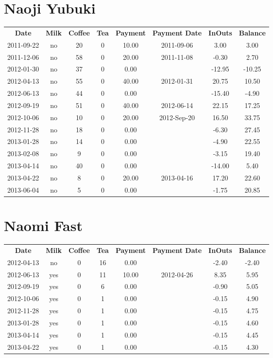 \section{Naoji Yubuki}

\begin{center}
\begin{tabular}{cccccccc}
\textbf{Date} & \textbf{Milk} & \textbf{Coffee} & \textbf{Tea} & \textbf{Payment} & \textbf{Payment Date} & \textbf{InOuts} & \textbf{Balance} \\
2011-09-22 & no & 20 & 0 & 10.00 & 2011-09-06 &   3.00 &   3.00\\ 
2011-12-06 & no & 58 & 0 & 20.00 & 2011-11-08 &  -0.30 &   2.70\\ 
2012-01-30 & no & 37 & 0 &  0.00 &  & -12.95 & -10.25\\ 
2012-04-13 & no & 55 & 0 & 40.00 & 2012-01-31 &  20.75 &  10.50\\ 
2012-06-13 & no & 44 & 0 &  0.00 &  & -15.40 &  -4.90\\ 
2012-09-19 & no & 51 & 0 & 40.00 & 2012-06-14 &  22.15 &  17.25\\ 
2012-10-06 & no & 10 & 0 & 20.00 & 2012-Sep-20 &  16.50 &  33.75\\ 
2012-11-28 & no & 18 & 0 &  0.00 &  &  -6.30 &  27.45\\ 
2013-01-28 & no & 14 & 0 &  0.00 &  &  -4.90 &  22.55\\ 
2013-02-08 & no &  9 & 0 &  0.00 &  &  -3.15 &  19.40\\ 
2013-04-14 & no & 40 & 0 &  0.00 &  & -14.00 &   5.40\\ 
2013-04-22 & no &  8 & 0 & 20.00 & 2013-04-16 &  17.20 &  22.60\\ 
2013-06-04 & no &  5 & 0 &  0.00 &  &  -1.75 &  20.85
\end{tabular}
\end{center}

\section{Naomi Fast}

\begin{center}
\begin{tabular}{cccccccc}
\textbf{Date} & \textbf{Milk} & \textbf{Coffee} & \textbf{Tea} & \textbf{Payment} & \textbf{Payment Date} & \textbf{InOuts} & \textbf{Balance} \\
2012-04-13 & no & 0 & 16 &  0.00 &  & -2.40 & -2.40\\ 
2012-06-13 & yes & 0 & 11 & 10.00 & 2012-04-26 &  8.35 &  5.95\\ 
2012-09-19 & yes & 0 &  6 &  0.00 &  & -0.90 &  5.05\\ 
2012-10-06 & yes & 0 &  1 &  0.00 &  & -0.15 &  4.90\\ 
2012-11-28 & yes & 0 &  1 &  0.00 &  & -0.15 &  4.75\\ 
2013-01-28 & yes & 0 &  1 &  0.00 &  & -0.15 &  4.60\\ 
2013-04-14 & yes & 0 &  1 &  0.00 &  & -0.15 &  4.45\\ 
2013-04-22 & yes & 0 &  1 &  0.00 &  & -0.15 &  4.30
\end{tabular}
\end{center}

